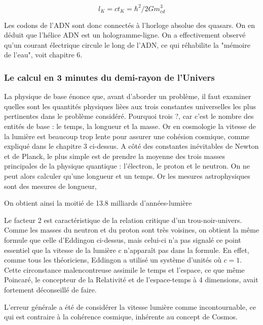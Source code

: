 \documentclass[a4paper,12pt]{article}
\begin{document}
\begin{equation}
l_K = ct_K  = \hbar^2/2Gm_{cd}^3 
\end{equation}      
     
Les codons de l'ADN sont donc connectés à l'horloge absolue des quasars. On en déduit que l'hélice ADN est un hologramme-ligne. On a effectivement observé qu'un courant électrique circule le long de l'ADN, ce qui réhabilite la "mémoire de l'eau", voit chapitre 6.




\subsubsection{Le calcul en 3 minutes du demi-rayon de l’Univers}

La physique de base énonce que, avant d’aborder un problème, il faut examiner quelles sont les quantités physiques lièes aux trois constantes universelles les plus pertinentes dans le problème considéré. Pourquoi trois ?, car c’est le nombre des entités de base : le  temps, la longueur et la masse. Or en cosmologie la vitesse de la lumière est beaucoup trop lente pour assurer une cohésion cosmique, comme expliqué dans le chapitre 3 ci-dessus. A côté des constantes inévitables de Newton et de Planck, le plus simple est de prendre la moyenne des trois masses principales de la physique quantique : l'électron, le proton et le neutron. On ne peut alors calculer qu’une longueur et un temps. Or les mesures astrophysiques sont des mesures de longueur, 


On obtient ainsi la moitié de 13.8 milliards d'années-lumière 


Le facteur 2 est caractéristique de la relation critique d’un trou-noir-univers. Comme les masses du neutron et du proton sont très voisines, on obtient la même formule que celle d’Eddingon ci-dessus, mais celui-ci n’a pas signalé ce point essentiel que la vitesse de la lumière c n’apparaît pas dans la formule. En effet, comme tous les théoriciens, Eddingon a utilisé un système d’unités où $c = 1$. Cette circonstance malencontreuse assimile le temps et l’espace, ce que même Poincaré, le concepteur de la Relativité et de l’espace-temps à 4 dimensions, avait fortement déconseillé de faire.


L’erreur générale a été de considérer la vitesse lumière comme incontournable, ce qui est contraire à la cohérence cosmique, inhérente au concept de Cosmos.

 
 
 
 
\end{document}
